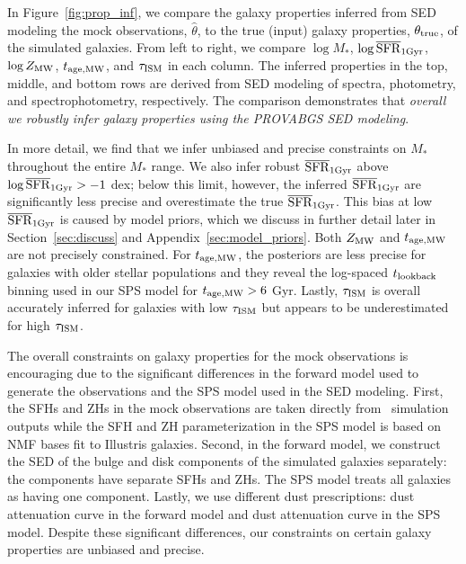 In Figure~\ref{fig:prop_inf}, we compare the galaxy properties inferred from
SED modeling the mock observations, $\hat{\theta}$, to the true (input) galaxy
properties, $\theta_{\rm true}$, of the simulated galaxies.
From left to right, we compare $\log M_*$, $\log \overline{\rm SFR}_{\rm 1Gyr}$, $\log Z_{\rm MW}$,
$t_{\rm age, MW}$, and $\tau_{\rm ISM}$ in each column.  
The inferred properties in the top, middle, and bottom rows are derived from
SED modeling of spectra, photometry, and spectrophotometry, respectively.
The comparison demonstrates that \emph{overall we robustly infer galaxy
properties using the {\sc PROVABGS} SED modeling}. 

In more detail, we find that we infer unbiased and precise constraints on
$M_*$ throughout the entire $M_*$ range. 
We also infer robust $\overline{\rm SFR}_{\rm 1Gyr}$ above $\log \overline{\rm SFR}_{\rm 1Gyr} > -1$ dex; below this limit,
however, the inferred $\overline{\rm SFR}_{\rm 1Gyr}$ are significantly less precise and
overestimate the true $\overline{\rm SFR}_{\rm 1Gyr}$. 
This bias at low $\overline{\rm SFR}_{\rm 1Gyr}$ is caused by model priors, which we discuss in
further detail later in Section~\ref{sec:discuss} and
Appendix~\ref{sec:model_priors}. 
Both $Z_{\rm MW}$ and $t_{\rm age, MW}$ are not precisely constrained. 
For $t_{\rm age, MW}$, the posteriors are less precise for galaxies with older stellar
populations and they reveal the log-spaced $t_{\rm lookback}$ binning used in our
SPS model for $t_{\rm age, MW} > 6$ Gyr.
Lastly, $\tau_{\rm ISM}$ is overall accurately inferred for galaxies with low
$\tau_{\rm ISM}$ but appears to be underestimated for high $\tau_{\rm ISM}$.

The overall constraints on galaxy properties for the mock observations is
encouraging due to the significant differences in the forward model used to
generate the observations and the SPS model used in the SED modeling. 
First, the SFHs and ZHs in the mock observations are taken directly from
\lgal~simulation outputs while the SFH and ZH parameterization in the SPS model
is based on NMF bases fit to Illustris galaxies.
Second, in the forward model, we construct the SED of the bulge and disk
components of the simulated galaxies separately: the components have separate
SFHs and ZHs. 
The SPS model treats all galaxies as having one component. 
Lastly, we use different dust prescriptions: \cite{mathis1983} dust
attenuation curve in the forward model and \cite{kriek2013} dust attenuation
curve in the SPS model. 
Despite these significant differences, our constraints on certain galaxy
properties are unbiased and precise. 

